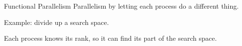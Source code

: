 
\begin{exerciseframe}
  
\end{exerciseframe}


\begin{numberedframe}{Functional Parallelism}
  Parallelism by letting each process do a different thing.

  Example: divide up a search space.

  Each process knows its rank, so it can find its part of the search space.
\end{numberedframe}

\begin{exerciseframe}[prime]
  
\end{exerciseframe}

\begin{exerciseframe}
  
\end{exerciseframe}

\endinput

\begin{numberedframe}\frametitle{}
\begin{lstlisting}
  
\end{lstlisting}
\end{numberedframe}

